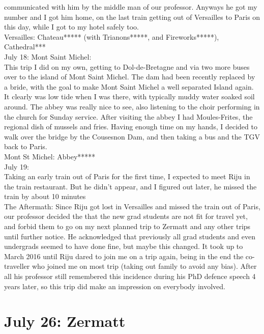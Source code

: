 communicated with him by the middle man of our professor. Anyways he got my number and I got him home, on the last train getting out of Versailles to Paris on this day, while I got to my hotel safely too.\\

Versailles: Chateau***** (with Trianons*****, and Fireworks*****), Cathedral***\\

July 18: Mont Saint Michel:\\
This trip I did on my own, getting to Dol-de-Bretagne and via two more buses over to the island of Mont Saint Michel. The dam had been recently replaced by a bride, with the goal to make Mont Saint Michel a well separated Island again. It clearly was low tide when I was there, with typically muddy water soaked soil around. The abbey was really nice to see, also listening to the choir performing in the church for Sunday service. After visiting the abbey I had Moules-Frites, the regional dish of mussels and fries. Having enough time on my hands, I decided to walk over the bridge by the Cousesnon Dam, and then taking a bus and the TGV back to Paris.\\

Mont St Michel: Abbey*****\\

July 19:\\
Taking an early train out of Paris for the first time, I expected to meet Riju in the train restaurant. But he didn't appear, and I figured out later, he missed the train by about 10 minutes\\

The Aftermath: Since Riju got lost in Versailles and missed the train out of Paris, our professor decided the that the new grad students are not fit for travel yet, and forbid them to go on my next planned trip to Zermatt and any other trips until further notice. He acknowledged that previously all grad students and even undergrads seemed to have done fine, but maybe this changed. It took up to March 2016 until Riju dared to join me on a trip again, being in the end the co-traveller who joined me on most trip (taking out family to avoid any bias). After all his professor still remembered this incidence during his PhD defence speech 4 years later, so this trip did make an impression on everybody involved.

\section{July 26: Zermatt}
\label{Zermatt2015}

